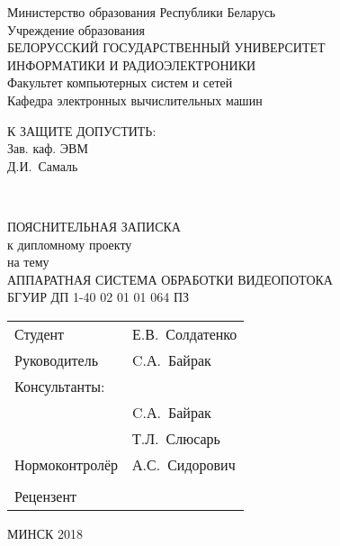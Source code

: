 \begin{titlepage}
  \begin{center}
    Министерство образования Республики Беларусь\\[1em]
    Учреждение образования\\
    БЕЛОРУССКИЙ ГОСУДАРСТВЕННЫЙ УНИВЕРСИТЕТ \\
    ИНФОРМАТИКИ И РАДИОЭЛЕКТРОНИКИ\\[1em]

    Факультет компьютерных систем и сетей \\[0.6cm]

    Кафедра электронных вычислительных машин \\[1.4cm]

    \begin{flushright}
      \begin{minipage}{0.4\textwidth}
        \MakeUppercase{К защите допустить:}\\
        Зав. каф. ЭВМ\\
        \underline{\hspace*{2.8cm}} Д.И.~Самаль
      \end{minipage}\\[3.2em]
    \end{flushright}

    {ПОЯСНИТЕЛЬНАЯ ЗАПИСКА}\\
    {к дипломному проекту}\\
    {на тему}\\
    {\MakeUppercase{Аппаратная система обработки видеопотока}}\\[2em]


    {БГУИР ДП 1-40 02 01 01 064 ПЗ}\\[2em]

    \begin{tabular}{ p{}p{} }
      Студент & Е.В.~Солдатенко  \\[1em]

      Руководитель & C.А.~Байрак \\[1em]

      Консультанты: &\\[1em]

      \hspace*{6ex}{от кафедры ЭВМ} & C.А.~Байрак \\[1em]

      \hspace*{6ex}{по экономической части} & Т.Л.~Слюсарь \\[1em]

      Нормоконтролёр & А.С.~Сидорович\\
      & \\
      Рецензент &
    \end{tabular}

    \vfill
    {\normalsize МИНСК 2018}
  \end{center}
\end{titlepage}
